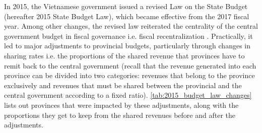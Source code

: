 \documentclass[12pt]{article}
\newcommand{\1}{\mathbbm{1}}
\begin{document}
In 2015, the Vietnamese government issued a revised Law on the State Budget (hereafter 2015 State Budget Law), which became effective from the 2017 fiscal year. Among other changes, the revised law reiterated the centrality of the central government budget in fiscal governance i.e. fiscal recentralization \citep{Vu2016}. Practically, it led to major adjustments to provincial budgets, particularly through changes in sharing rates i.e. the proportions of the shared revenue that provinces have to remit back to the central government (recall that the revenue generated into each province can be divided into two categories: revenues that belong to the province exclusively and revenues that must be shared between the provincial and the central government according to a fixed ratio). \autoref{tab:2015_budget_law_changes} lists out provinces that were impacted by these adjustments, along with the proportions they get to keep from the shared revenues before and after the adjustments.
\end{document}
